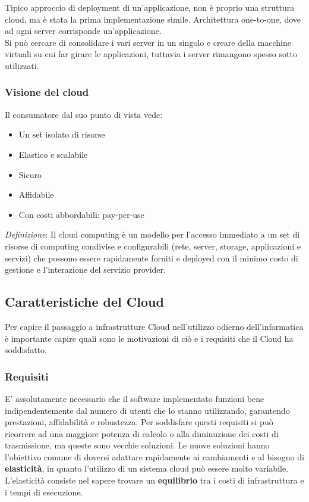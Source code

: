 \documentclass{article}
\begin{document}
		Tipico approccio di deployment di un'applicazione, non è proprio una struttura cloud, ma è stata la prima implementazione simile.
		Architettura one-to-one, dove ad ogni server corrisponde un'applicazione.\\
		Si può cercare di consolidare i vari server in un singolo e creare della macchine virtuali su cui far girare le applicazioni, tuttavia i server rimangono spesso sotto utilizzati.
		
		\subsubsection{Visione del cloud}
		Il consumatore dal suo punto di vista vede:
		\begin{itemize}
		    \item Un set isolato di risorse
		    \item Elastico e scalabile
		    \item Sicuro
		    \item Affidabile
		    \item Con costi abbordabili: pay-per-use
		\end{itemize}
		
		\emph{Definizione}: Il cloud computing è un modello per l'accesso immediato a un set di risorse di computing condivise e configurabili (rete, server, storage, applicazioni e servizi) che possono essere rapidamente forniti e deployed con il minimo costo di gestione e l'interazione del servizio provider. 
		
		\subsection{Caratteristiche del Cloud}
		Per capire il passaggio a infrastrutture Cloud nell'utilizzo odierno dell'informatica è importante capire quali sono le motivazioni di ciò e i requisiti che il Cloud ha soddisfatto.
		
		\subsubsection{Requisiti}
		E' assolutamente necessario che il software implementato funzioni bene indipendentemente dal numero di utenti che lo stanno utilizzando, garantendo prestazioni, affidabilità e robustezza. 
		Per soddisfare questi requisiti si può ricorrere ad una maggiore potenza di calcolo o alla diminuzione dei costi di trasmissione, ma queste sono vecchie soluzioni. Le nuove soluzioni hanno l'obiettivo comune di doversi adattare rapidamente ai cambiamenti e al bisogno di \textbf{elasticità}, in quanto l'utilizzo di un sistema cloud può essere molto variabile.
		L'elasticità consiste nel sapere trovare un \textbf{equilibrio} tra i costi di infrastruttura e i tempi di esecuzione.
		
\end{document}
